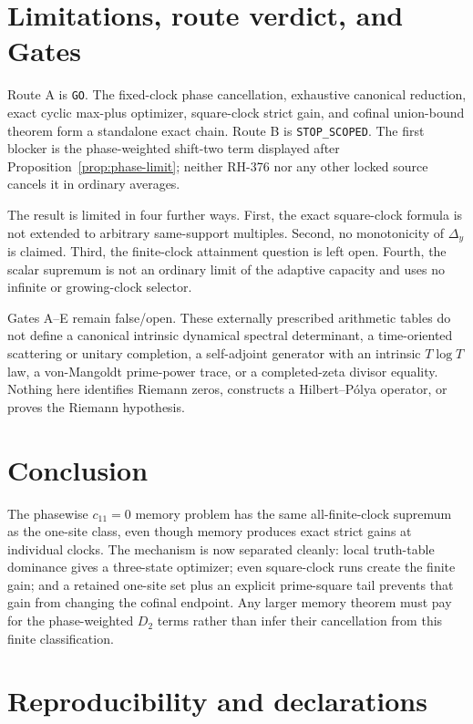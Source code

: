 \documentclass[11pt]{article}
\theoremstyle{definition}
\theoremstyle{remark}
\begin{document}
\section{Limitations, route verdict, and Gates}

Route A is \texttt{GO}.  The fixed-clock phase cancellation, exhaustive
canonical reduction, exact cyclic max-plus optimizer, square-clock strict
gain, and cofinal union-bound theorem form a standalone exact chain.  Route B
is \texttt{STOP\_SCOPED}.  The first blocker is the phase-weighted
shift-two term displayed after Proposition~\ref{prop:phase-limit}; neither
RH-376 nor any other locked source cancels it in ordinary averages.

The result is limited in four further ways.  First, the exact square-clock
formula is not extended to arbitrary same-support multiples.  Second, no
monotonicity of $\Delta_y$ is claimed.  Third, the finite-clock attainment
question is left open.  Fourth, the scalar supremum is not an ordinary limit
of the adaptive capacity and uses no infinite or growing-clock selector.

Gates A--E remain false/open.  These externally prescribed arithmetic
tables do not define a canonical intrinsic dynamical spectral determinant,
a time-oriented scattering or unitary completion, a self-adjoint generator
with an intrinsic $T\log T$ law, a von-Mangoldt prime-power trace, or a
completed-zeta divisor equality.  Nothing here identifies Riemann zeros,
constructs a Hilbert--P\'olya operator, or proves the Riemann hypothesis.

\section{Conclusion}

The phasewise $c_{11}=0$ memory problem has the same all-finite-clock
supremum as the one-site class, even though memory produces exact strict
gains at individual clocks.  The mechanism is now separated cleanly: local
truth-table dominance gives a three-state optimizer; even square-clock runs
create the finite gain; and a retained one-site set plus an explicit
prime-square tail prevents that gain from changing the cofinal endpoint.
Any larger memory theorem must pay for the phase-weighted $D_2$ terms rather
than infer their cancellation from this finite classification.

\section*{Reproducibility and declarations}
\end{document}
